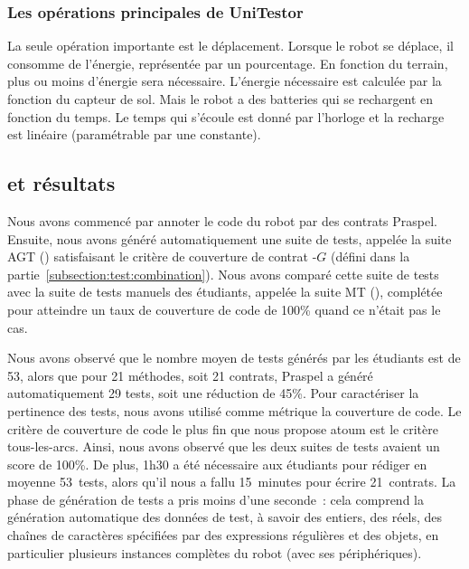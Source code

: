 \subsubsection{Les opérations principales de UniTestor}

La seule opération importante est le déplacement. Lorsque le robot se déplace,
il consomme de l'énergie, représentée par un pourcentage. En fonction du
terrain, plus ou moins d'énergie sera nécessaire. L'énergie nécessaire est
calculée par la fonction  du capteur de sol. Mais le robot
a des batteries qui se rechargent en fonction du temps. Le temps qui s'écoule
est donné par l'horloge et la recharge est linéaire (paramétrable par une
constante).

\subsection{ et résultats}

Nous avons commencé par annoter le code du robot par des contrats Praspel.
Ensuite, nous avons généré automatiquement une suite de tests, appelée la suite
AGT () satisfaisant le critère de
couverture de contrat -$G$ (défini dans la
partie~\ref{subsection:test:combination}). Nous avons comparé cette suite de
tests avec la suite de tests manuels des étudiants, appelée la suite MT
(), complétée pour atteindre un taux de couverture de
code de 100\% quand ce n'était pas le cas.

Nous avons observé que le nombre moyen de tests générés par les étudiants est de
53, alors que pour 21 méthodes, soit 21 contrats, Praspel a généré
automatiquement 29 tests, soit une réduction de 45\%. Pour caractériser la
pertinence des tests, nous avons utilisé comme métrique la couverture de code.
Le critère de couverture de code le plus fin que nous propose atoum est le
critère tous-les-arcs. Ainsi, nous avons observé que les deux suites de tests
avaient un score de 100\%. De plus, 1h30 a été nécessaire aux étudiants pour
rédiger en moyenne 53~tests, alors qu'il nous a fallu 15~minutes pour écrire
21~contrats.  La phase de génération de tests a pris moins d'une seconde~: cela
comprend la génération automatique des données de test, à savoir des entiers,
des réels, des chaînes de caractères spécifiées par des expressions régulières
et des objets, en particulier plusieurs instances complètes du robot (avec ses
périphériques).

